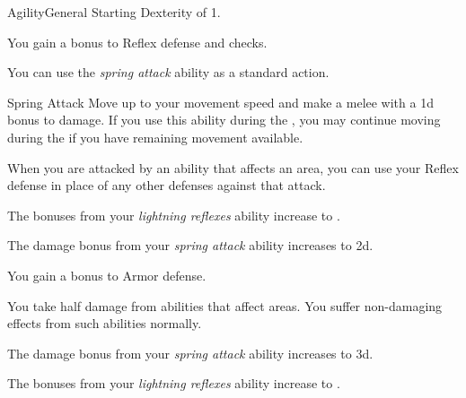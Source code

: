     \begin{feat}{Agility}{General}
        \featpre Starting Dexterity of 1.

         You gain a  bonus to Reflex defense and  checks.

         You can use the \textit{spring attack} ability as a standard action.
        \begin{apability}{Spring Attack}
            Move up to your movement speed and make a melee  with a \plus1d bonus to damage.
            If you use this ability during the , you may continue moving during the  if you have remaining movement available.
        \end{apability}

         When you are attacked by an ability that affects an area, you can use your Reflex defense in place of any other defenses against that attack.

         The bonuses from your \textit{lightning reflexes} ability increase to .

         The damage bonus from your \textit{spring attack} ability increases to \plus2d.

         You gain a  bonus to Armor defense.

         You take half damage from abilities that affect areas.
        You suffer non-damaging effects from such abilities normally.

         The damage bonus from your \textit{spring attack} ability increases to \plus3d.

         The bonuses from your \textit{lightning reflexes} ability increase to .
    \end{feat}

